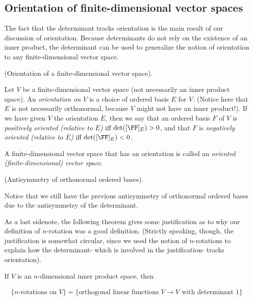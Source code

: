 \subsection*{Orientation of finite-dimensional vector spaces}

\label{ch::lin_alg::orientation_finite_dim_vector_space}

The fact that the determinant tracks orientation is the main result of our discussion of orientation. Because determinants do not rely on the existence of an inner product, the determinant can be used to generalize the notion of orientation to any finite-dimensional vector space.

\begin{defn}
\label{ch::lin_alg::defn::orientation_finite_dim_vector_space}
    (Orientation of a finite-dimensional vector space).
    
    Let $V$ be a finite-dimensional vector space (not necessarily an inner product space). An \textit{orientation on $V$} is a choice of ordered basis $E$ for $V$. (Notice here that $E$ is not necessarily orthonormal, because $V$ might not have an inner product!). If we have given $V$ the orientation $E$, then we say that an ordered basis $F$ of $V$ is \textit{positively oriented (relative to $E$)} iff $\det([\FF]_E) > 0$, and that $F$ is \textit{negatively oriented (relative to $E$)} iff $\det([\FF]_E) < 0$.
    
    A finite-dimensional vector space that has an orientation is called an \textit{oriented (finite-dimensional) vector space}.
\end{defn}
 
\begin{remark}
    (Antisymmetry of orthonormal ordered bases).
    
    Notice that we still have the previous antisymmetry of orthonormal ordered bases due to the antisymmetry of the determinant.
\end{remark}

As a last sidenote, the following theorem gives some justification as to why our definition of $n$-rotation was a good definition. (Strictly speaking, though, the justification is somewhat circular, since we used the notion of $n$-rotations to explain how the determinant- which is involved in the justification- tracks orientation).

\begin{theorem}
    If $V$ is an $n$-dimensional inner product space, then 
    
    \begin{align*}
        \{\text{$n$-rotations on $V$}\} = \{\text{orthogonal linear functions $V \rightarrow V$ with determinant 1}\}
    \end{align*}
\end{theorem}

